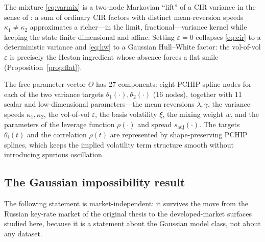 \documentclass[11pt]{article}
\theoremstyle{plain}
\theoremstyle{definition}
\begin{document}
The mixture \eqref{eq:varmix} is a two-node Markovian ``lift'' of a CIR variance
in the sense of \citet{AbiJaber2019}: a sum of ordinary CIR factors with
distinct mean-reversion speeds $\kappa_1 \neq \kappa_2$ approximates a
richer---in the limit, fractional---variance kernel while keeping the state
finite-dimensional and affine. Setting $\varepsilon = 0$ collapses
\eqref{eq:cir} to a deterministic variance and \eqref{eq:hw} to a Gaussian
Hull--White factor: the vol-of-vol $\varepsilon$ is precisely the Heston
ingredient whose absence forces a flat smile (Proposition~\ref{prop:flat}).

The free parameter vector $\Theta$ has 27 components: eight PCHIP spline nodes
for each of the two variance targets $\theta_1(\cdot), \theta_2(\cdot)$ (16
nodes), together with 11 scalar and low-dimensional parameters---the mean
reversions $\lambda, \gamma$, the variance speeds $\kappa_1, \kappa_2$, the
vol-of-vol $\varepsilon$, the basis volatility $\xi$, the mixing weight $w$, and
the parameters of the leverage function $\rho(\cdot)$ and spread
$s_{\mathrm{adj}}(\cdot)$. The targets $\theta_i(t)$ and the correlation
$\rho(t)$ are represented by shape-preserving PCHIP splines, which keeps the
implied volatility term structure smooth without introducing spurious
oscillation.

\subsection{The Gaussian impossibility result}

The following statement is market-independent: it survives the move from the
Russian key-rate market of the original thesis to the developed-market surfaces
studied here, because it is a statement about the Gaussian model class, not about
any dataset.
\end{document}
